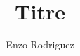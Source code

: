 \documentclass{report}
\begin{document}
\title{Titre}
\author{Enzo Rodriguez}
\date{}

\maketitle
\end{document}
